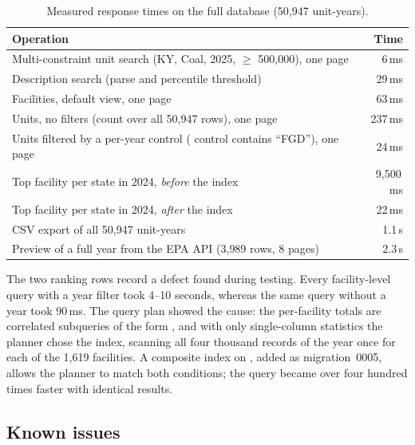 \documentclass[11pt,a4paper]{article}
\begin{document}
\begin{table}[H]
\centering\small
\caption{Measured response times on the full database (50{,}947 unit-years).}
\label{tab:perf}
\begin{tabularx}{\linewidth}{@{}Lr@{}}
\toprule
\textbf{Operation} & \textbf{Time}\\
\midrule
Multi-constraint unit search (KY, Coal, 2025, \COtwo{} $\ge$ 500{,}000), one page & 6\,ms\\
Description search (parse and percentile threshold) & 29\,ms\\
Facilities, default view, one page & 63\,ms\\
Units, no filters (count over all 50{,}947 rows), one page & 237\,ms\\
Units filtered by a per-year control (\SOtwo{} control contains ``FGD''), one page & 24\,ms\\
Top facility per state in 2024, \emph{before} the  index & 9{,}500\,ms\\
Top facility per state in 2024, \emph{after} the index & 22\,ms\\
CSV export of all 50{,}947 unit-years & 1.1\,s\\
Preview of a full year from the EPA API (3{,}989 rows, 8 pages) & 2.3\,s\\
\bottomrule
\end{tabularx}
\end{table}

The two ranking rows record a defect found during testing. Every facility-level query with a
year filter took 4--10 seconds, whereas the same query without a year took 90\,ms. The query
plan showed the cause: the per-facility totals are correlated subqueries of the form
, and with only single-column statistics the planner
chose the  index, scanning all four thousand records of the year
once for each of the 1{,}619 facilities. A composite index on ,
added as migration~0005, allows the planner to match both conditions; the query became over four
hundred times faster with identical results.

\subsection{Known issues}
\end{document}
